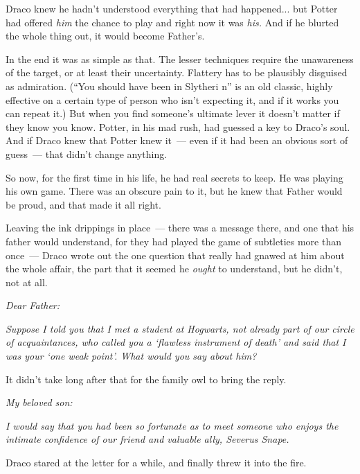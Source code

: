 Draco knew he hadn't understood everything that had happened... but Potter had offered \emph{him} the chance to play and right now it was \emph{his.} And if he blurted the whole thing out, it would become Father's.

In the end it was as simple as that. The lesser techniques require the unawareness of the target, or at least their uncertainty. Flattery has to be plausibly disguised as admiration. (``You should have been in Slytheri n'' is an old classic, highly effective on a certain type of person who isn't expecting it, and if it works you can repeat it.) But when you find someone's ultimate lever it doesn't matter if they know you know. Potter, in his mad rush, had guessed a key to Draco's soul. And if Draco knew that Potter knew it~--- even if it had been an obvious sort of guess~--- that didn't change anything.

So now, for the first time in his life, he had real secrets to keep. He was playing his own game. There was an obscure pain to it, but he knew that Father would be proud, and that made it all right.

Leaving the ink drippings in place~--- there was a message there, and one that his father would understand, for they had played the game of subtleties more than once~--- Draco wrote out the one question that really had gnawed at him about the whole affair, the part that it seemed he \emph{ought} to understand, but he didn't, not at all.

\emph{Dear Father:}

\emph{Suppose I told you that I met a student at Hogwarts, not already part of our circle of acquaintances, who called you a `flawless instrument of death' and said that I was your `one weak point'. What would you say about him?}

It didn't take long after that for the family owl to bring the reply.

\emph{My beloved son:}

\emph{I would say that you had been so fortunate as to meet someone who enjoys the intimate confidence of our friend and valuable ally, Severus Snape.}

Draco stared at the letter for a while, and finally threw it into the fire.
